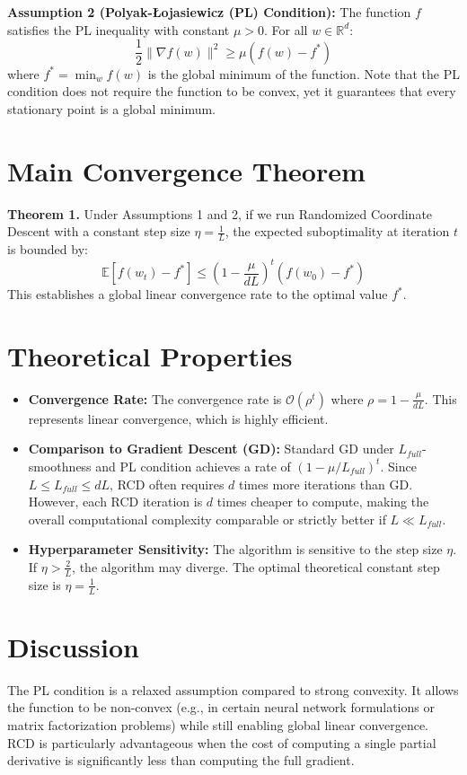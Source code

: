 \documentclass[11pt]{article}
\begin{document}
\textbf{Assumption 2 (Polyak-\L{}ojasiewicz (PL) Condition):}
The function $f$ satisfies the PL inequality with constant $\mu > 0$. For all $w \in \mathbb{R}^d$:
\begin{equation}
    \frac{1}{2} \|\nabla f(w)\|^2 \geq \mu (f(w) - f^*)
\end{equation}
where $f^* = \min_w f(w)$ is the global minimum of the function. Note that the PL condition does not require the function to be convex, yet it guarantees that every stationary point is a global minimum.

\section*{Main Convergence Theorem}
\textbf{Theorem 1.} Under Assumptions 1 and 2, if we run Randomized Coordinate Descent with a constant step size $\eta = \frac{1}{L}$, the expected suboptimality at iteration $t$ is bounded by:
\begin{equation}
    \mathbb{E}[f(w_t) - f^*] \leq \left(1 - \frac{\mu}{dL}\right)^t (f(w_0) - f^*)
\end{equation}
This establishes a global linear convergence rate to the optimal value $f^*$.

\section*{Theoretical Properties}
\begin{itemize}
    \item \textbf{Convergence Rate:} The convergence rate is $\mathcal{O}(\rho^t)$ where $\rho = 1 - \frac{\mu}{dL}$. This represents linear convergence, which is highly efficient.
    \item \textbf{Comparison to Gradient Descent (GD):} Standard GD under $L_{full}$-smoothness and PL condition achieves a rate of $(1 - \mu/L_{full})^t$. Since $L \leq L_{full} \leq dL$, RCD often requires $d$ times more iterations than GD. However, each RCD iteration is $d$ times cheaper to compute, making the overall computational complexity comparable or strictly better if $L \ll L_{full}$.
    \item \textbf{Hyperparameter Sensitivity:} The algorithm is sensitive to the step size $\eta$. If $\eta > \frac{2}{L}$, the algorithm may diverge. The optimal theoretical constant step size is $\eta = \frac{1}{L}$.
\end{itemize}

\section*{Discussion}
The PL condition is a relaxed assumption compared to strong convexity. It allows the function to be non-convex (e.g., in certain neural network formulations or matrix factorization problems) while still enabling global linear convergence. RCD is particularly advantageous when the cost of computing a single partial derivative is significantly less than computing the full gradient.
\end{document}
